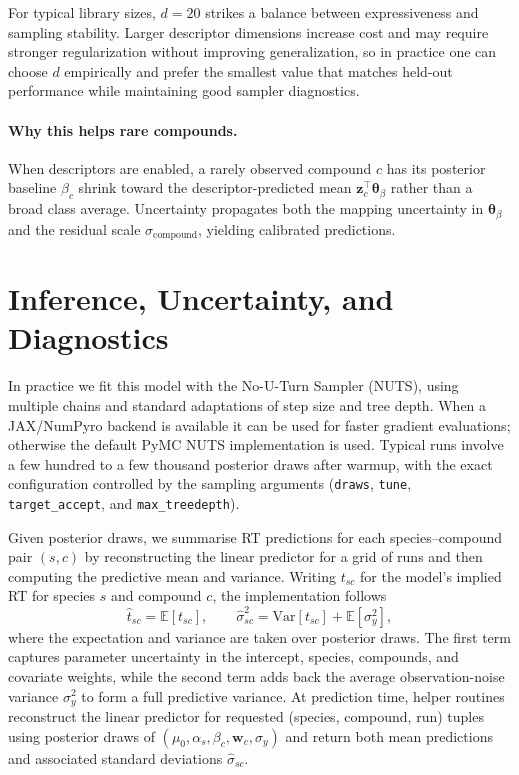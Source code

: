 \documentclass[11pt]{article}
\begin{document}
For typical library sizes, $d=20$ strikes a balance between expressiveness and sampling
stability. Larger descriptor dimensions increase cost and may require stronger
regularization without improving generalization, so in practice one can choose $d$
empirically and prefer the smallest value that matches held-out performance while
maintaining good sampler diagnostics.

\paragraph{Why this helps rare compounds.}
When descriptors are enabled, a rarely observed compound $c$ has its posterior
baseline $\beta_c$ shrink toward the descriptor-predicted mean
$\bm{z}_c^{\top}\bm{\theta}_\beta$ rather than a broad class average. Uncertainty
propagates both the mapping uncertainty in $\bm{\theta}_\beta$ and the residual scale
$\sigma_{\mathrm{compound}}$, yielding calibrated predictions.

\section{Inference, Uncertainty, and Diagnostics}

In practice we fit this model with the No-U-Turn Sampler (NUTS), using multiple chains
and standard adaptations of step size and tree depth. When a JAX/NumPyro backend is
available it can be used for faster gradient evaluations; otherwise the default PyMC
NUTS implementation is used. Typical runs involve a few hundred to a few thousand
posterior draws after warmup, with the exact configuration controlled by the sampling
arguments (\texttt{draws}, \texttt{tune}, \texttt{target\_accept}, and
\texttt{max\_treedepth}).

Given posterior draws, we summarise RT predictions for each species--compound pair
$(s,c)$ by reconstructing the linear predictor for a grid of runs and then computing
the predictive mean and variance. Writing $t_{sc}$ for the model's implied RT for
species $s$ and compound $c$, the implementation follows
\begin{equation}
  \hat{t}_{sc}=\mathbb{E}[t_{sc}],
  \qquad
  \hat{\sigma}^2_{sc}=\mathrm{Var}[t_{sc}]+\mathbb{E}[\sigma_y^2],
\end{equation}
where the expectation and variance are taken over posterior draws. The first term
captures parameter uncertainty in the intercept, species, compounds, and covariate
weights, while the second term adds back the average observation-noise variance
$\sigma_y^2$ to form a full predictive variance. At prediction time, helper routines
reconstruct the linear predictor for requested (species, compound, run) tuples using
posterior draws of $(\mu_0,\alpha_s,\beta_c,\bm{w}_c,\sigma_y)$ and return both mean
predictions and associated standard deviations $\hat{\sigma}_{sc}$.
\end{document}
